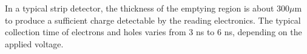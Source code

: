\noindent In a typical strip detector, the thickness of the emptying region is about 300$\mu$m to produce a sufficient charge detectable by the reading electronics. 
The typical collection time of electrons and holes varies from 3 ns to 6 ns, depending on the applied voltage.















































